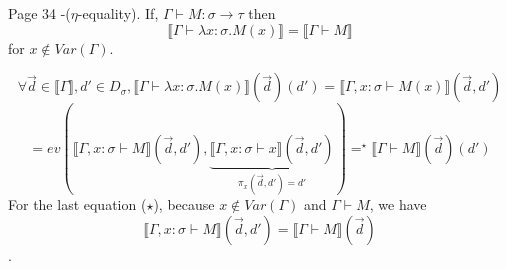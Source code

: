 \begin{problem}{Page 34}
    -($\eta$-equality). If, $\Gamma \vdash M:\sigma \to \tau$ then
$$ \llbracket \Gamma \vdash \lambda x:\sigma . M(x) \rrbracket = \llbracket \Gamma \vdash M \rrbracket $$
for $x \notin Var(\Gamma)$.
\end{problem}

\begin{solution}
    $$ \forall \vec{d} \in \llbracket \Gamma \rrbracket, d' \in D_\sigma, \llbracket \Gamma \vdash \lambda x : \sigma . M(x) \rrbracket (\vec{d})(d') = \llbracket \Gamma , x:\sigma \vdash M(x) \rrbracket (\vec{d}, d') $$
$$ = ev(\llbracket \Gamma , x:\sigma \vdash M \rrbracket (\vec{d}, d'), \underbrace{\llbracket \Gamma , x:\sigma \vdash x \rrbracket(\vec{d}, d')}_{\pi_x(\vec{d}, d') = d'}) =^\star \llbracket \Gamma \vdash M \rrbracket (\vec{d})(d')$$
For the last equation ($\star$), because $x \notin Var(\Gamma)$ and $\Gamma \vdash M$, we have $$\llbracket \Gamma , x:\sigma \vdash M \rrbracket (\vec{d},d') = \llbracket \Gamma \vdash M \rrbracket (\vec{d})$$.
\end{solution}